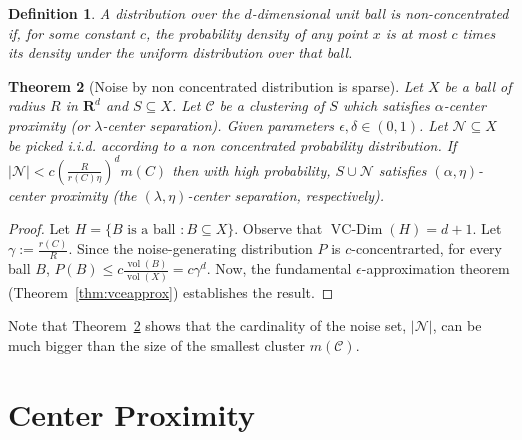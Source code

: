 \documentclass[12pt]{article}
\newtheorem{theorem}{Theorem}
\newtheorem{definition}[theorem]{Definition}
\newcommand{\mc}{\mathcal}
\newcommand{\mb}{\mathbf}
\DeclareMathOperator{\vcdim}{VC-Dim}
\DeclareMathOperator{\vol}{vol}
\begin{document}
\begin{definition} 
A distribution over the $d$-dimensional unit ball is non-concentrated if, for some constant $c$, the probability density of any point $x$ is at most $c$ times its density under the uniform distribution over that ball.
\end{definition}

\begin{theorem}[Noise by non concentrated distribution is sparse]
\label{theorem:sparse}
Let $X$ be a ball of radius $R$ in $\mb R^d$ and $S \subseteq X$. Let $\mc C$ be a clustering of $S$ which satisfies $\alpha$-center proximity (or $\lambda$-center separation). Given parameters $\epsilon, \delta \in (0,1)$. Let $\mc N \subseteq X$ be picked i.i.d. according to a non concentrated probability distribution. If $|\mc N| < c  \left( \frac{R}{r(C) \eta} \right) ^d m(C)$
then with high probability, $S \cup \mc N$  satisfies $(\alpha, \eta)$-center proximity (the $(\lambda, \eta)$-center separation, respectively).
\end{theorem}
\begin{proof}
Let $H = \{B \text{ is a ball }: B \subseteq X\}$. Observe that $\vcdim(H) = d+1$. Let $\gamma := \frac{r(C)}{R}$. Since the noise-generating distribution $P$ is $c$-concentrarted, for every ball $B$, $P(B) \leq c \frac{\vol(B)}{\vol(X)} = c\gamma^d$. Now, the fundamental $\epsilon$-approximation theorem (Theorem~\ref{thm:vceapprox}) establishes the result.
\end{proof}

\noindent Note that Theorem~\ref{theorem:sparse} shows that the cardinality of the noise set, $|\mc N|$, can be much bigger than the size of the smallest cluster $m(\mc C)$. 

\section{Center Proximity}
\label{section:cp}
\end{document}
